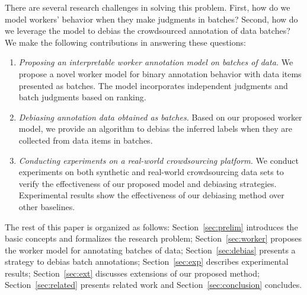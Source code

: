 There are several research challenges in solving this problem.
First, how do we model workers' behavior when they make judgments in batches?
Second, how do we leverage the model to debias the crowdsourced annotation of data batches?
We make the following contributions in answering these questions:
\begin{enumerate}
  \item \emph{Proposing an interpretable worker annotation model on batches of data.}
        We propose a novel worker model for binary annotation behavior with data items presented as batches.
        The model incorporates independent judgments and batch judgments based on ranking.
  \item \emph{Debiasing annotation data obtained as batches.}
        Based on our proposed worker model, we provide an algorithm to debias the inferred labels
        when they are collected from data items in batches.
  \item \emph{Conducting experiments on a real-world crowdsourcing platform.}
        We conduct experiments on both synthetic and real-world crowdsourcing data sets
        to verify the effectiveness of our proposed model and debiasing strategies.
        Experimental results show the effectiveness of our debiasing method over other baselines.
\end{enumerate}

The rest of this paper is organized as follows:
Section~\ref{sec:prelim} introduces the basic concepts and formalizes the research problem;
Section~\ref{sec:worker} proposes the worker model for annotating batches of data;
Section~\ref{sec:debias} presents a strategy to debias batch annotations;
Section~\ref{sec:exp} describes experimental results;
Section~\ref{sec:ext} discusses extensions of our proposed method;
Section~\ref{sec:related} presents related work and Section~\ref{sec:conclusion} concludes.






